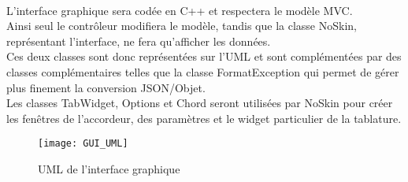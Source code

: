 \paragraph{}
	L'interface graphique sera codée en C++ et respectera le modèle MVC. \\
	Ainsi seul le contrôleur modifiera le modèle, tandis que la classe NoSkin, représentant l'interface,
	ne fera qu'afficher les données. \\
	Ces deux classes sont donc représentées sur l'UML et sont complémentées par des classes complémentaires
	telles que la classe FormatException qui permet de gérer plus finement la conversion JSON/Objet.\\
	Les classes TabWidget, Options et Chord seront utilisées par NoSkin pour créer les fenêtres de 
	l'accordeur, des paramètres et le widget particulier de la tablature.

\begin{figure}[H]

	\centering 
	\texttt{[image: GUI\_UML]}
		\caption{UML de l'interface graphique}
			

\end{figure}

